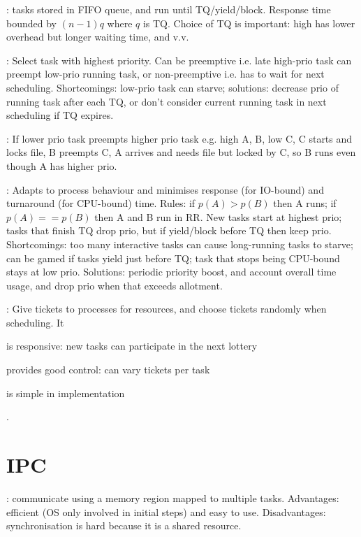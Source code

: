 \documentclass[fontsize=9pt]{slnotes}
\begin{document}
: tasks stored in FIFO queue, and run until TQ/yield/block. Response time bounded by \((n-1)q\) where \(q\) is TQ. Choice of TQ is important: high has lower overhead but longer waiting time, and v.v.

: Select task with highest priority. Can be preemptive i.e. late high-prio task can preempt low-prio running task, or non-preemptive i.e. has to wait for next scheduling. Shortcomings: low-prio task can starve; solutions: decrease prio of running task after each TQ, or don't consider current running task in next scheduling if TQ expires.

: If lower prio task preempts higher prio task e.g. high A, B, low C, C starts and locks file, B preempts C, A arrives and needs file but locked by C, so B runs even though A has higher prio.

: Adapts to process behaviour and minimises response (for IO-bound) and turnaround (for CPU-bound) time. Rules: if \(p(A) > p(B)\) then A runs; if \(p(A) == p(B)\) then A and B run in RR. New tasks start at highest prio; tasks that finish TQ drop prio, but if yield/block before TQ then keep prio. Shortcomings: too many interactive tasks can cause long-running tasks to starve; can be gamed if tasks yield just before TQ; task that stops being CPU-bound stays at low prio. Solutions: periodic priority boost, and account overall time usage, and drop prio when that exceeds allotment.

: Give tickets to processes for resources, and choose tickets randomly when scheduling. It \begin{slinenum}
\item is responsive: new tasks can participate in the next lottery
\item provides good control: can vary tickets per task
\item is simple in implementation
\end{slinenum}.

\chapter{IPC}
: communicate using a memory region mapped to multiple tasks. Advantages: efficient (OS only involved in initial steps) and easy to use. Disadvantages: synchronisation is hard because it is a shared resource.
\end{document}

